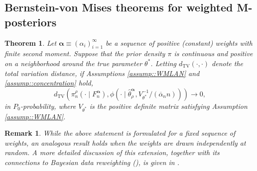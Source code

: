 \documentclass[11pt, oneside]{amsart}
\newtheorem{theorem}{Theorem}[]
\newtheorem{remark}{Remark}
\theoremstyle{definition}   %
\newcommand{\loss}{\rho}
\newcommand{\wempirical}{F_n^{\boldsymbol{\alpha}}}
\newcommand{\mestimator}{\hat{\theta}^{\boldsymbol{\alpha}}_{\loss }}
\begin{document}
%
%
\subsection{Bernstein-von Mises theorems for weighted M-posteriors}
\begin{theorem}
\label{thm::BvM}
    Let \(\boldsymbol{\alpha} \equiv (\alpha_i)_{i = 1}^{\infty}\) be a sequence of positive (constant) weights with finite second moment. Suppose that the prior density $\pi$ is continuous and positive on a neighborhood around the true parameter $\theta^*$. Letting $d_{\mathrm{TV}}(\cdot, \cdot)$ denote the total variation distance, if Assumptions \ref{assump::WMLAN} and \ref{assump::concentration} hold,
    \begin{equation}
    \label{eq:Thm1}
        d_{\mathrm{TV}} \left( \pi^\loss_{n}(\cdot \mid \wempirical), \phi(\cdot \mid \mestimator, V_{\theta^*}^{-1} / (\overline{\alpha}_n n)) \right) \to 0,
    \end{equation}
    in $P_0$-probability, where $V_{\theta^*}$ is the positive definite matrix satisfying Assumption \ref{assump::WMLAN}.
\end{theorem} 
%
\begin{remark}
    While the above statement is formulated for a fixed sequence of weights, an analogous result holds when the weights are drawn independently at random. A more detailed discussion of this extension, together with its connections to Bayesian data reweighting (), is given in .
\end{remark}
\end{document}
